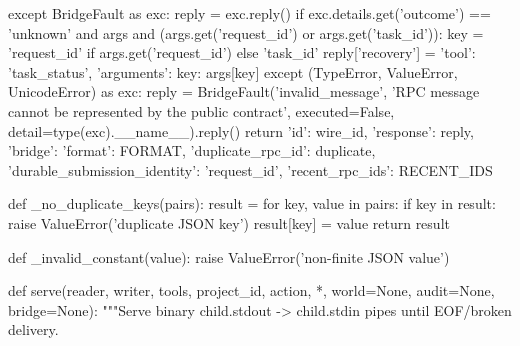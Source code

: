         except BridgeFault as exc:
            reply = exc.reply()
            if exc.details.get('outcome') == 'unknown' and args and (args.get('request_id') or args.get('task_id')):
                key = 'request_id' if args.get('request_id') else 'task_id'
                reply['recovery'] = {'tool': 'task_status', 'arguments': {key: args[key]}}
        except (TypeError, ValueError, UnicodeError) as exc:
            reply = BridgeFault('invalid_message', 'RPC message cannot be represented by the public contract',
                                executed=False, detail=type(exc).__name__).reply()
        return {'id': wire_id, 'response': reply,
                'bridge': {'format': FORMAT, 'duplicate_rpc_id': duplicate,
                           'durable_submission_identity': 'request_id', 'recent_rpc_ids': RECENT_IDS}}


def _no_duplicate_keys(pairs):
    result = {}
    for key, value in pairs:
        if key in result:
            raise ValueError('duplicate JSON key')
        result[key] = value
    return result


def _invalid_constant(value):
    raise ValueError('non-finite JSON value')


def serve(reader, writer, tools, project_id, action, *, world=None, audit=None, bridge=None):
    """Serve binary child.stdout -> child.stdin pipes until EOF/broken delivery.

